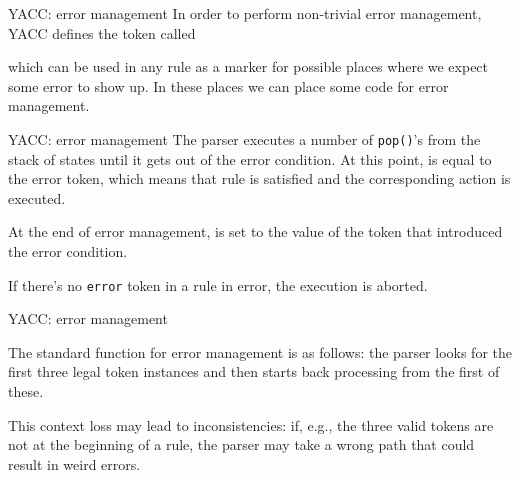 \begin{frame}[fragile]{YACC: error management}
In order to perform non-trivial error management, YACC
defines the token called

\vspace{20pt}


\begin{center}\end{center}


\vspace{20pt}

which can be used in any rule as a marker for possible places
where we expect some error to show up. In these places we can
place some code for error management.

 
\end{frame}
\begin{frame}[fragile]{YACC: error management}
The parser executes a number of 
{\tt pop()}'s from the stack of states until it gets out of the
error condition. At this point, \lat{} is equal to the error token,
which means that rule is satisfied and the corresponding action
is executed.


\vspace{20pt}

At the end of error management, \lat{} is set to the value of the
token that introduced the error condition.
\label{clearlat}


\vspace{20pt}

If there's no {\tt error} token in a rule in error, the execution
is aborted.





\end{frame}
\begin{frame}[fragile]{YACC: error management}

The standard function for error management is as follows:
the parser looks for the first three legal token instances
and then starts back processing from the first of these.


\vspace{20pt}

This context loss may lead to inconsistencies: if, e.g.,
the three valid tokens are not at the beginning of a rule,
the parser may take a wrong path that could result
in weird errors.




\end{frame}

